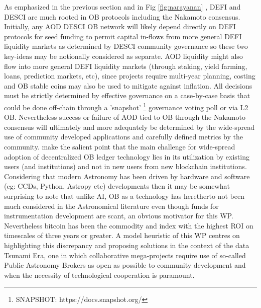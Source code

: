 \documentclass[final,5p,times,twocolumn,authoryear]{elsarticle}
\begin{document}
As emphasized in the previous section and in Fig \ref{fig:narayanan}
, DEFI and DESCI are much rooted in OB protocols including the Nakamoto consensus. Initially, any AOD DESCI OB network will likely depend directly on DEFI protocols for seed funding to permit capital in-flows from more general DEFI liquidity markets as determined by DESCI community governance so these two key-ideas may be notionally considered as separate. AOD liquidity might also flow into more general DEFI liquidity markets (through staking, yield farming, loans, prediction markets, etc), since projects require multi-year planning, costing and OB stable coins may also be used to mitigate against inflation. All decisions must be strictly determined by effective governance on a case-by-case basis that could be done off-chain through a 'snapshot' \footnote{SNAPSHOT: https://docs.snapshot.org/} governance voting poll or via L2 OB. Nevertheless success or failure of AOD tied to OB through the Nakamoto consensus will ultimately and more adequately be determined by the wide-spread use of community developed applications and carefully defined metrics by the community. \cite{arvindandclark2017} make the salient point that the main challenge for wide-spread adoption of decentralized OB ledger technology lies in its utilization by existing users (and institutions) and not in new users from new blockchain institutions. Considering that modern Astronomy has been driven by hardware and software (eg: CCDs, Python, Astropy etc) developments then it may be somewhat surprising to note that unlike AI, OB as a technology has heretherto not been much considered in the Astronomical literature even though funds for instrumentation development are scant, an obvious motivator for this WP. Nevertheless bitcoin has been the commodity and index with the highest ROI on timescales of three years or greater. A model heuristic of this WP centres on highlighting this discrepancy and proposing solutions in the context of the data Tsunami Era, one in which collaborative mega-projects require use of so-called Public Astronomy Brokers as open as possible to community development and when the necessity of technological cooperation is paramount.  
\end{document}
